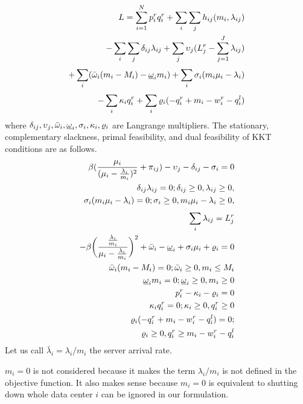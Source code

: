 \begin{align}
	L = \sum_{i=1}^{N} p^r_i q^r_i + \sum_{i}^{}\sum_{j}^{}h_{ij}(m_i, \lambda_{ij}) \nonumber \\
	- \sum_{i}^{}\sum_{j}^{} \delta_{ij} \lambda_{ij}  + \sum_{j}^{}\upsilon_j(L^r_j - \sum_{j=1}^{J} \lambda_{ij})  \nonumber \\
	+ \sum_{i}^{}(\bar{\omega}_i(m_i-M_i) - \underbar{$\omega$}_i m_i) + \sum_{i} \sigma_i (m_i\mu_i - \lambda_i) \nonumber \\
	- \sum_{i}^{}\kappa_i q^r_i + \sum_{i}^{}\varrho_i(-q^r_i + m_i - w^r_i - q^l_i) 
\end{align}
where $\delta_{ij}, \upsilon_j, \bar{\omega}_i, \underbar{$\omega$}_i, \sigma_i, \kappa_i, \varrho_i$ are Langrange multipliers.  The stationary, complementary slackness, primal feasibility, and dual feasibility of KKT conditions are as follows.
\begin{eqnarray}
\label{eq:KKTStationary1}
\beta (\frac{\mu_i}{(\mu_i-\frac{\lambda_i}{m_i})^2}+\pi_{ij}) - \upsilon_j - \delta_{ij} -\sigma_i = 0 \\
\delta_{ij}\lambda_{ij} = 0; \delta_{ij} \geq 0, \lambda_{ij} \geq 0, \\
\label{eq:FeasiblityLambda1}
\sigma_i(m_i\mu_i-\lambda_i) = 0; \sigma_i \geq 0, m_i\mu_i - \lambda_i \geq 0, \\
\label{eq:FeasiblityLambda2}
\sum_{i}^{}	\lambda_{ij} = L^r_j \\
\label{eq:KKTStationary2}
- \beta \bigg (\frac{\frac{\lambda_i}{m_i}}{\mu_i - \frac{\lambda_i}{m_i}}\bigg)^2 + \bar{\omega}_i - \underbar{$\omega$}_i + \sigma_i\mu_i + \varrho_i = 0 \\
\bar{\omega}_i(m_i - M_i) = 0; \bar{\omega}_i \geq 0, m_i \leq M_i \\
\label{eq:KKTStationary2_1}
\underbar{$\omega$}_i m_i = 0; \underbar{$\omega$}_i \geq 0, m_i \geq 0 \\
\label{eq:KKTStationary3}
p_i^r - \kappa_i - \varrho_i = 0 \\
\label{eq:Feasiblity_q}
\kappa_i q^r_i = 0; \kappa_i \geq 0, q^r_i \geq 0 \\
\varrho_i(-q^r_i + m_i - w^r_i - q^l_i)  = 0; \nonumber \\ \varrho_i \geq 0, q^r_i \geq m_i - w^r_i - q^l_i 
\end{eqnarray}
Let us call $\bar{\lambda}_i = \lambda_i/m_i$ the server arrival rate.

$m_i=0$ is not considered because it makes the term $\lambda_i / m_i$ is not defined in the objective function. It also makes sense because $m_i=0$ is equivalent to shutting down whole data center $i$ can be ignored in our formulation.

